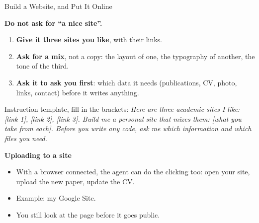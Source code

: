 \documentclass[svgnames,x11names,dvipsnames]{beamer}
\newcommand{\chg}[1]{{\bfseries #1}}
\renewcommand{\chg}[1]{#1}
\begin{document}
\begin{frame}{\chg{Build a Website, and Put It Online}}

\small
\textbf{\chg{Do not ask for ``a nice site''.}}
\begin{enumerate}
    \setlength{\itemsep}{4pt}
    \item \chg{\textbf{Give it three sites you like}, with their links.}
    \item \chg{\textbf{Ask for a mix}, not a copy: the layout of one, the typography of another, the tone of the third.}
    \item \chg{\textbf{Ask it to ask you first}: which data it needs (publications, CV, photo, links, contact) before it writes anything.}
\end{enumerate}

\vspace{0.25cm}

{\footnotesize \chg{Instruction template, fill in the brackets:} \chg{\textit{Here are three academic sites I like: [link 1], [link 2], [link 3]. Build me a personal site that mixes them: [what you take from each]. Before you write any code, ask me which information and which files you need.}}}

\vspace{0.35cm}

\textbf{\chg{Uploading to a site}}
\begin{itemize}
    \setlength{\itemsep}{2pt}
    \item \chg{With a browser connected, the agent can do the clicking too: open your site, upload the new paper, update the CV.}
    \item \chg{Example: my Google Site.}
    \item \chg{You still look at the page before it goes public.}
\end{itemize}

\end{frame}
\end{document}
